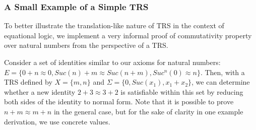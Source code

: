 \documentclass{article}
\begin{document}
\subsubsection{A Small Example of a Simple TRS}

To better illustrate the translation-like nature of TRS in the context of equational logic, we implement a very informal proof of commutativity property
over natural numbers from the perspective of a TRS.

Consider a set of identities similar to our axioms for natural numbers:
$E = \{0 + n \approx 0, Suc(n) + m \approx Suc(n + m), Suc^n(0) \approx n\}$.
Then, with a TRS defined by $X = \{m,n\}$ and $\Sigma = \{0, Suc(x_1), x_1 + x_2\}$,
we can determine whether a new identity $2 + 3 \approx 3 + 2$
is satisfiable within this set by reducing both sides of the identity to normal form.
Note that it is possible to prove $n + m \approx m + n$ in the general case, but for the sake of clarity in one example derivation,
we use concrete values.
\end{document}

